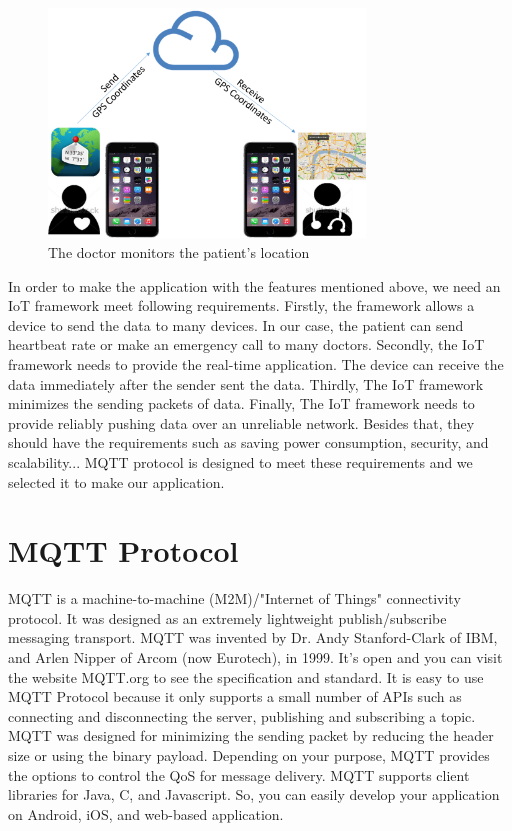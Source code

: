 \begin{figure}[htbp]
\centering
\includegraphics[width=0.75\textwidth]{scenario3.png}
\caption{The doctor monitors the patient's location}
\label{fig:scenario3}
\end{figure}

In order to make the application with the features mentioned above, we need an IoT framework meet following requirements. Firstly, the framework allows a device to send the data to many devices. In our case, the patient can send heartbeat rate or make an emergency call to many doctors. Secondly, the IoT framework needs to provide the real-time application. The device can receive the data immediately after the sender sent the data. Thirdly, The IoT framework minimizes the sending packets of data. Finally, The IoT framework needs to provide reliably pushing data over an unreliable network. Besides that, they should have the requirements such as saving power consumption, security, and scalability... MQTT protocol is designed to meet these requirements and we selected it to make our application.

\section{MQTT Protocol}

MQTT is a machine-to-machine (M2M)/"Internet of Things" connectivity protocol. It was designed as an extremely lightweight publish/subscribe messaging transport. MQTT was invented by Dr. Andy Stanford-Clark of IBM, and Arlen Nipper of Arcom (now Eurotech), in 1999. It's open and you can visit the website MQTT.org to see the specification and standard. It is easy to use MQTT Protocol because it only supports a small number of APIs such as connecting and disconnecting the server, publishing and subscribing a topic. MQTT was designed for minimizing the sending packet by reducing the header size or using the binary payload. Depending on your purpose, MQTT provides the options to control the QoS for message delivery. MQTT supports client libraries for Java, C, and Javascript. So, you can easily develop your application on Android, iOS, and web-based application.

